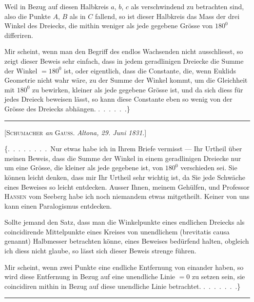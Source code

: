 

%
Weil in Bezug auf diesen Halbkreis $a$, $b$, $c$ als verschwindend zu betrachten sind, also die Punkte $A$, $B$ als in $C$ fallend, so ist dieser Halbkreis das Mass der drei Winkel des Dreiecks, die mithin weniger als jede gegebene Grösse von $180^0$ differiren.

Mir scheint, wenn man den Begriff des endlos Wachsenden nicht ausschliesst, so zeigt dieser Beweis sehr einfach, dass in jedem  geradlinigen Dreiecke die Summe der Winkel $=180^0$ ist, oder eigentlich, dass die Constante, die, wenn Euklids Geometrie nicht wahr wäre, zu der Summe der Winkel kommt, um die Gleichheit mit $180^0$ zu bewirken, kleiner als jede gegebene Grösse ist, und da sich diess für jedes Dreieck beweisen lässt, so kann diese Constante eben so wenig von der Grösse des Dreiecks abhängen. \mbox{.\ .\ .\ .\ .\ .}\}

\bigskip
\hrule
\bigskip

\begin{center}
[\textsc{Schumacher} \emph{an} \textsc{Gauss}. \emph{Altona, 29. Juni 1831.}]
\end{center}

\{\mbox{.\ .\ .\ .\ .\ .}\ .\ .\ Nur etwas habe ich in Ihrem Briefe vermisst — Ihr Urtheil über meinen Beweis, dass die Summe der Winkel in einem geradlinigen Dreiecke nur um eine Grösse, die kleiner als jede gegebene ist, von $180^0$ verschieden sei. Sie können leicht denken, dass mir Ihr Urtheil sehr wichtig ist, da Sie jede Schwäche eines Beweises so leicht entdecken. Ausser Ihnen, meinem Gehülfen, und Professor \textsc{Hansen} vom Seeberg habe ich noch niemandem etwas mitgetheilt. Keiner von uns kann einen Paralogismus entdecken.

Sollte jemand den Satz, dass man die Winkelpunkte eines endlichen Dreiecks als coincidirende Mittelpunkte eines Kreises von unendlichem (brevitatis causa  genannt) Halbmesser betrachten könne, eines Beweises bedürfend halten, obgleich ich diess nicht glaube, so lässt sich dieser Beweis strenge führen.

Mir scheint, wenn zwei Punkte eine endliche Entfernung von einander haben, so wird diese Entfernung in Bezug auf eine unendliche Linie $=0$ zu setzen sein, sie coincidiren mithin in Bezug auf diese unendliche Linie betrachtet. \mbox{.\ .\ .\ .\ .\ .}\ .\}

\bigskip
\hrule
\bigskip
